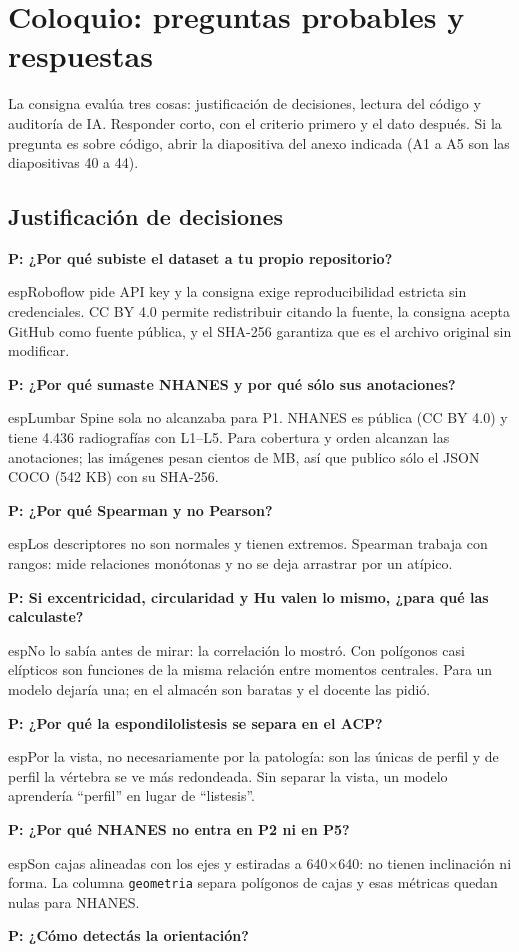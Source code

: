 \documentclass[11pt,a4paper]{article}
\newcommand{\preg}[1]{\par\medskip\textbf{P: #1}\par\nopagebreak}
\begin{document}
\section*{Coloquio: preguntas probables y respuestas}
La consigna evalúa tres cosas: justificación de decisiones, lectura del código y auditoría de IA. Responder corto, con el criterio primero y el dato después. Si la pregunta es sobre código, abrir la diapositiva del anexo indicada (A1 a A5 son las diapositivas 40 a 44).

\subsection*{Justificación de decisiones}
\preg{¿Por qué subiste el dataset a tu propio repositorio?}

esp{Roboflow pide API key y la consigna exige reproducibilidad estricta sin credenciales. CC BY 4.0 permite redistribuir citando la fuente, la consigna acepta GitHub como fuente pública, y el SHA-256 garantiza que es el archivo original sin modificar.}
\preg{¿Por qué sumaste NHANES y por qué sólo sus anotaciones?}

esp{Lumbar Spine sola no alcanzaba para P1. NHANES es pública (CC BY 4.0) y tiene 4.436 radiografías con L1--L5. Para cobertura y orden alcanzan las anotaciones; las imágenes pesan cientos de MB, así que publico sólo el JSON COCO (542 KB) con su SHA-256.}
\preg{¿Por qué Spearman y no Pearson?}

esp{Los descriptores no son normales y tienen extremos. Spearman trabaja con rangos: mide relaciones monótonas y no se deja arrastrar por un atípico.}
\preg{Si excentricidad, circularidad y Hu valen lo mismo, ¿para qué las calculaste?}

esp{No lo sabía antes de mirar: la correlación lo mostró. Con polígonos casi elípticos son funciones de la misma relación entre momentos centrales. Para un modelo dejaría una; en el almacén son baratas y el docente las pidió.}
\preg{¿Por qué la espondilolistesis se separa en el ACP?}

esp{Por la vista, no necesariamente por la patología: son las únicas de perfil y de perfil la vértebra se ve más redondeada. Sin separar la vista, un modelo aprendería ``perfil'' en lugar de ``listesis''.}
\preg{¿Por qué NHANES no entra en P2 ni en P5?}

esp{Son cajas alineadas con los ejes y estiradas a 640$\times$640: no tienen inclinación ni forma. La columna \texttt{geometria} separa polígonos de cajas y esas métricas quedan nulas para NHANES.}
\preg{¿Cómo detectás la orientación?}
\end{document}
